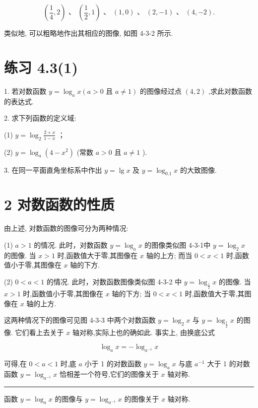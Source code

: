 \documentclass[10pt]{article}
\newcommand{\HRule}{\begin{center}\rule{0.9\linewidth}{0.2mm}\end{center}}
\begin{document}
\[
\left( {\frac{1}{4},2}\right) \text{ 、 }\left( {\frac{1}{2},1}\right) \text{ 、 }\left( {1,0}\right) \text{ 、 }\left( {2, - 1}\right) \text{ 、 }\left( {4, - 2}\right) .
\]

类似地, 可以粗略地作出其相应的图像, 如图 4-3-2 所示.

\section*{练习 4.3(1)}

1. 若对数函数 \(y = {\log }_{a}x\left( {a > 0\text{ 且 }a \neq  1}\right)\) 的图像经过点 \(\left( {4,2}\right)\) ,求此对数函数的表达式.



2. 求下列函数的定义域:

(1) \(y = {\log }_{2}\frac{2 + x}{1 - x}\) ；

(2) \(y = {\log }_{a}\left( {4 - {x}^{2}}\right)\) (常数 \(a > 0\) 且 \(a \neq  1\) ).

3. 在同一平面直角坐标系中作出 \(y = \lg x\) 及 \(y = {\log }_{0.1}x\) 的大致图像.

\section*{2 对数函数的性质}

由上述, 对数函数的图像可分为两种情况:

(1) \(a > 1\) 的情况. 此时，对数函数 \(y = {\log }_{a}x\) 的图像类似图 4-3-1中 \(y = {\log }_{2}x\) 的图像. 当 \(x > 1\) 时,函数值大于零,其图像在 \(x\) 轴的上方; 而当 \(0 < x < 1\) 时,函数值小于零,其图像在 \(x\) 轴的下方.

(2) \(0 < a < 1\) 的情况. 此时，对数函数图像类似图 4-3-2 中 \(y = {\log }_{\frac{1}{2}}x\) 的图像. 当 \(x > 1\) 时,函数值小于零,其图像在 \(x\) 轴的下方; 当 \(0 < x < 1\) 时,函数值大于零,其图像在 \(x\) 轴的上方.

这两种情况下的图像可见图 4-3-3 中两个对数函数 \(y = {\log }_{2}x\) 与 \(y = {\log }_{\frac{1}{2}}x\) 的图像. 它们看上去关于 \(x\) 轴对称,实际上也的确如此. 事实上, 由换底公式

\[
{\log }_{a}x =  - {\log }_{{a}^{-1}}x
\]

可得,在 \(0 < a < 1\) 时,底 \(a\) 小于 1 的对数函数 \(y = {\log }_{a}x\) 与底 \({a}^{-1}\) 大于 1 的对数函数 \(y = {\log }_{{a}^{-1}}x\) 恰相差一个符号,它们的图像关于 \(x\) 轴对称.

\HRule

函数 \(y = {\log }_{a}x\) 的图像与 \(y = {\log }_{{a}^{-1}}x\) 的图像关于 \(x\) 轴对称.
\end{document}
